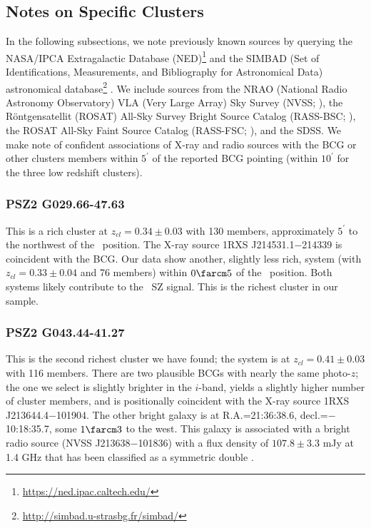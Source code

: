 \documentclass[apj, revtex4-1]{emulateapj}
\begin{document}
\subsection{Notes on Specific Clusters}
In the following subsections, we note previously known sources by querying the NASA/IPCA Extragalactic Database (NED)\footnote{\url{https://ned.ipac.caltech.edu/}} and the SIMBAD (Set of Identifications, Measurements, and Bibliography for Astronomical Data) astronomical database\footnote{\url{http://simbad.u-strasbg.fr/simbad/}} \citep{Wenger2000}. We include sources from the NRAO (National Radio Astronomy Observatory) VLA (Very Large Array) Sky Survey (NVSS; \citealt{Condon1998}), the R\"{o}ntgensatellit (ROSAT) All-Sky Survey Bright Source Catalog (RASS-BSC; \citealt{Voges1999a}), the ROSAT All-Sky Faint Source Catalog (RASS-FSC; \citealt{Voges2000}), and the SDSS. We make note of  confident associations of X-ray and radio sources with the BCG or other clusters members within $5^\prime$ of the reported BCG pointing (within $10^\prime$ for the three low redshift clusters).

\subsubsection{PSZ2 G029.66-47.63}  %
This is a rich cluster at $z_{cl} = 0.34 \pm 0.03$ with 130 members, approximately $5^\prime$ to the northwest of the \planck\ position. The X-ray source 1RXS J214531.1$-$214339 is coincident with the BCG. Our data show another, slightly less rich, system (with $z_{cl} = 0.33 \pm 0.04$ and 76 members) within $0\farcm5$ of the \planck\ position. Both systems likely contribute to the \planck\ SZ signal.  This is the richest cluster in our sample.

\subsubsection{PSZ2 G043.44-41.27}  %
This is the second richest cluster we have found; the system is at $z_{cl} = 0.41 \pm 0.03$ with 116 members.  There are two plausible BCGs with nearly the same photo-$z$; the one we select is slightly brighter in the $i$-band, yields a slightly higher number of cluster members, and is positionally coincident with the X-ray source 1RXS J213644.4$-$101904. The other bright galaxy is at R.A.=21:36:38.6, decl.=$-$10:18:35.7, some $1\farcm3$ to the west. This galaxy is associated with a bright radio source (NVSS J213638$-$101836) with a flux density of $107.8 \pm 3.3$ mJy at 1.4 GHz that has been classified as a symmetric double \citep{Douglas1996}.
\end{document}
